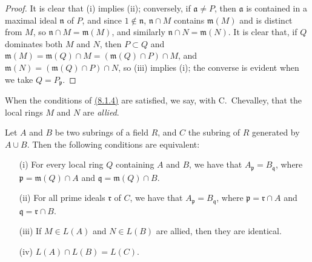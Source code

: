 \begin{proof}
\label{proof-lem-1.8.1.4}
It is clear that (i) implies (ii); conversely, if $\mathfrak{a}\neq P$, then
$\mathfrak{a}$ is contained in a maximal ideal $\mathfrak{n}$ of $P$, and since
$1\not\in\mathfrak{n}$, $\mathfrak{n}\cap M$ contains $\mathfrak{m}(M)$ and is
distinct from $M$, so $\mathfrak{n}\cap M=\mathfrak{m}(M)$, and similarly
$\mathfrak{n}\cap N=\mathfrak{m}(N)$. It is clear that, if $Q$ dominates both
$M$ and $N$, then $P\subset Q$ and
$\mathfrak{m}(M)=\mathfrak{m}(Q)\cap M=(\mathfrak{m}(Q)\cap P)\cap M$, and
$\mathfrak{m}(N)=(\mathfrak{m}(Q)\cap P)\cap N$, so (iii) implies (i); the converse
is evident when we take $Q=P_\mathfrak{p}$.
\end{proof}

When the conditions of \hyperref[lem-1.8.1.4]{(8.1.4)} are satisfied, we say, with C.~Chevalley,
that the local rings $M$ and $N$ are {\it allied}.

\begin{prop}[8.1.5]
\label{prop-1.8.1.5}
Let $A$ and $B$ be two subrings of a field $R$,
and $C$ the subring of $R$ generated by $A\cup B$. Then the following
conditions are equivalent:
\begin{itemize}
  \item[{\rm(i)}] For every local ring $Q$ containing $A$ and $B$, we have that
        $A_\mathfrak{p}=B_\mathfrak{q}$, where $\mathfrak{p}=\mathfrak{m}(Q)\cap A$ and
        $\mathfrak{q}=\mathfrak{m}(Q)\cap B$.
  \item[{\rm(ii)}] For all prime ideals $\mathfrak{r}$ of $C$, we have that
        $A_\mathfrak{p}=B_\mathfrak{q}$, where $\mathfrak{p}=\mathfrak{r}\cap A$ and
        $\mathfrak{q}=\mathfrak{r}\cap B$.
  \item[{\rm(iii)}] If $M\in L(A)$ and $N\in L(B)$ are allied, then they are identical.
  \item[{\rm(iv)}] $L(A)\cap L(B)=L(C)$.
\end{itemize}
\end{prop}

